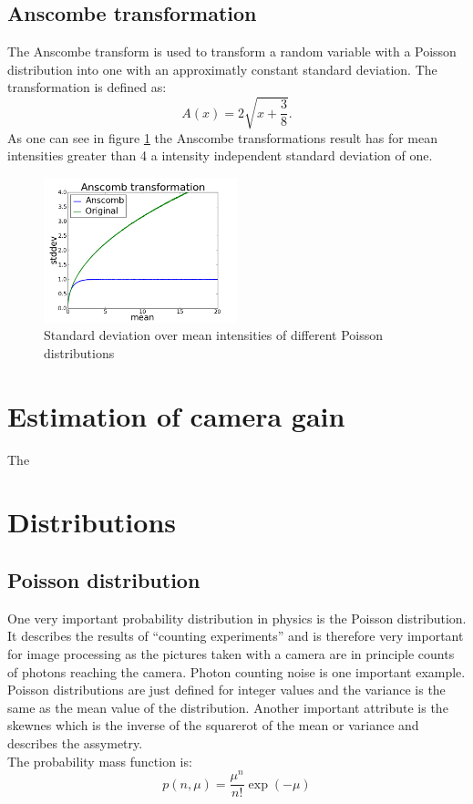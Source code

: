 \subsection{Anscombe transformation}
The Anscombe transform is used to transform a random variable with a Poisson
distribution into one with an approximatly constant standard deviation. The
transformation is defined as:
\begin{equation}
	A(x) = 2\sqrt{x+\frac{3}{8}}.
\end{equation}
As one can see in figure \ref{anscombe} the Anscombe transformations result has
for mean intensities greater than 4 a intensity independent standard deviation of
one.
\begin{figure}
	\centering
	\includegraphics[width = 0.5\textwidth]{pictures/anscombe.png}
	\caption{Standard deviation over mean intensities of different Poisson
	distributions}
	\label{anscombe}
	
\end{figure}

\section{Estimation of camera gain}
The 

\section{Distributions}
\subsection{Poisson distribution}
One very important probability distribution in physics is the Poisson
distribution. It describes the results of ``counting experiments'' and is
therefore very important for image processing as the pictures taken with a
camera are in principle counts of photons reaching the camera. Photon counting
noise is one important example.\\
Poisson distributions are just defined for integer values and the variance is
the same as the mean value of the distribution. Another important attribute is
the skewnes which is the inverse of the squarerot of the mean or variance and describes the assymetry.\\ 
The probability mass function is:
\begin{equation}
	p(n,\mu) = \frac{\mu^n}{n!}\exp(-\mu)
\end{equation}

